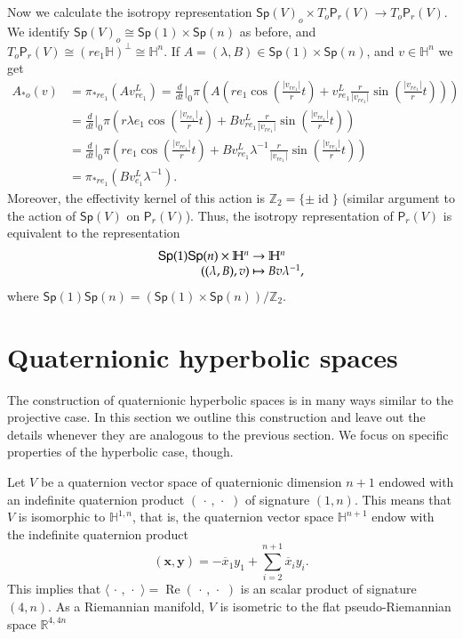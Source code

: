 \documentclass[12pt, a4paper,draft]{amsart}
\newcommand{\id}{\operatorname{id}}
\newcommand{\R}{\mathbb{R}}
\renewcommand{\H}{\mathbb{H}}
\renewcommand{\Re}{\operatorname{Re}}
\newcommand{\Sp}{\mathsf{Sp}}
\theoremstyle{remark}
\begin{document}
Now we calculate the isotropy representation $\Sp(V)_o\times T_o\mathsf{P}_r(V)\to T_o\mathsf{P}_r(V)$.
We identify $\Sp(V)_o\cong \Sp(1)\times\Sp(n)$ as before, and $T_o\mathsf{P}_r(V)\cong(re_1\H)^\perp\cong\H^{n}$.
If $A=(\lambda,B)\in\Sp(1)\times\Sp(n)$, and $v\in\H^n$ we get
\[
\begin{aligned}
A_{*o}(v)
&{}=\pi_{*re_1}(Av_{re_1}^L)
=\frac{d}{dt}\Big\vert_0 \pi\left(A
\left(re_1\cos\left(\frac{\lvert v_{re_1}\rvert}{r}t\right)+v_{re_1}^L\frac{r}{\lvert v_{re_1}\rvert}\sin\left(\frac{\lvert v_{re_1}\rvert}{r}t\right)\right)\right)\\
&{}=\frac{d}{dt}\Big\vert_0 \pi\left(r\lambda e_1\cos\left(\frac{\lvert v_{re_1}\rvert}{r}t\right)+Bv_{re_1}^L\frac{r}{\lvert v_{re_1}\rvert}\sin\left(\frac{\lvert v_{re_1}\rvert}{r}t\right)\right)\\
&{}=\frac{d}{dt}\Big\vert_0 \pi\left(r e_1\cos\left(\frac{\lvert v_{re_1}\rvert}{r}t\right)+Bv_{re_1}^L\lambda^{-1}\frac{r}{\lvert v_{re_1}\rvert}\sin\left(\frac{\lvert v_{re_1}\rvert}{r}t\right)\right)\\[1ex]
&{}=\pi_{*re_1}(Bv_{e_1}^L\lambda^{-1}).
\end{aligned}
\]
Moreover, the effectivity kernel of this action is $\mathbb{Z}_2=\{\pm\id\}$ (similar argument to the action of $\Sp(V)$ on $\mathsf{P}_r(V)$).
Thus, the isotropy representation of $\mathsf{P}_r(V)$ is equivalent to the representation
\[
\begin{array}{r@{\ }c@{\ }l}
\Sp(1)\Sp(n)\times\H^n & \to & \H^n\\
((\lambda,B),v) & \mapsto & Bv\lambda^{-1},
\end{array}
\]
where $\Sp(1)\Sp(n)=(\Sp(1)\times\Sp(n))/\mathbb{Z}_2$.


\section{Quaternionic hyperbolic spaces}

The construction of quaternionic hyperbolic spaces is in many ways similar to the projective case.
In this section we outline this construction and leave out the details whenever they are analogous to the previous section.
We focus on specific properties of the hyperbolic case, though.

Let $V$ be a quaternion vector space of quaternionic dimension $n+1$ endowed with an indefinite quaternion product $(\,\cdot\,,\,\cdot\,\,)$ of signature $(1,n)$.
This means that $V$ is isomorphic to $\H^{1,n}$, that is, the quaternion vector space $\H^{n+1}$ endow with the indefinite quaternion product 
\[
(\mathbf{x},\mathbf{y})
=-\overline{x}_1{y}_1+\sum_{i=2}^{n+1}\overline{x}_i {y}_i.
\]
This implies that $\langle\,\cdot\,,\,\cdot\,\,\rangle=\Re(\,\cdot\,,\,\cdot\,\,)$ is an scalar product of signature $(4,n)$.
As a Riemannian manifold, $V$ is isometric to the flat pseudo-Riemannian space $\R^{4,4n}$
\end{document}
